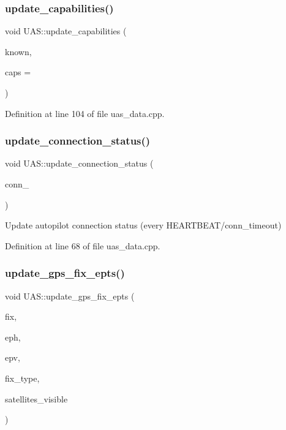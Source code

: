 \subsubsection{\texorpdfstring{update\_capabilities()}{update\_capabilities()}}
{\footnotesize\ttfamily void U\+A\+S\+::update\+\_\+capabilities (\begin{DoxyParamCaption}\item[{bool}]{known,  }\item[{uint64\+\_\+t}]{caps = {} }\end{DoxyParamCaption})}



Definition at line 104 of file uas\+\_\+data.\+cpp.

\mbox{\label{group__nodelib_ga566ad54aab4ddea1c0e3756870fe9c91}} 
\subsubsection{\texorpdfstring{update\_connection\_status()}{update\_connection\_status()}}
{\footnotesize\ttfamily void U\+A\+S\+::update\+\_\+connection\+\_\+status (\begin{DoxyParamCaption}\item[{bool}]{conn\+\_\+ }\end{DoxyParamCaption})}

Update autopilot connection status (every H\+E\+A\+R\+T\+B\+E\+A\+T/conn\+\_\+timeout) 

Definition at line 68 of file uas\+\_\+data.\+cpp.

\mbox{\label{group__nodelib_ga5230fcf5827b4a682efe35b91a66152b}} 
\subsubsection{\texorpdfstring{update\_gps\_fix\_epts()}{update\_gps\_fix\_epts()}}
{\footnotesize\ttfamily void U\+A\+S\+::update\+\_\+gps\+\_\+fix\+\_\+epts (\begin{DoxyParamCaption}\item[{sensor\+\_\+msgs\+::\+Nav\+Sat\+Fix\+::\+Ptr \&}]{fix,  }\item[{float}]{eph,  }\item[{float}]{epv,  }\item[{int}]{fix\+\_\+type,  }\item[{int}]{satellites\+\_\+visible }\end{DoxyParamCaption})}




